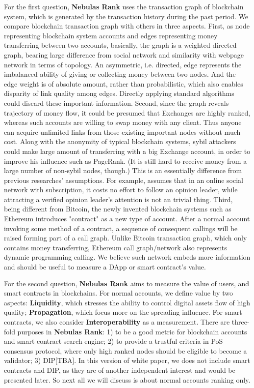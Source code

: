 For the first question, \textbf{Nebulas Rank} uses the transaction graph of blockchain system, which is generated by the transaction history during the past period. We compare blockchain transaction graph with others in three aspects. First, as node representing blockchain system accounts and edges representing money transferring between two accounts, basically, the graph is a weighted directed graph, bearing large difference from social network\cite{Ugander2011} and similarity with webpage network\cite{} in terms of topology. An asymmetric, i.e. directed, edge represents the imbalanced ability of giving or collecting money between two nodes. And the edge weight is of absolute amount, rather than probabilistic, which also enables disparity of link quality among edges. Directly applying standard algorithms could discard these important information. Second, since the graph reveals trajectory of money flow, it could be presumed that Exchanges are highly ranked, whereas such accounts are willing to swap money with any client. Thus anyone can acquire unlimited links from those existing important nodes without much cost. Along with the anonymity of typical blockchain systems, sybil attackers could make large amount of transferring with a big Exchange account, in order to improve his influence such as PageRank. (It is still hard to receive money from a large number of non-sybil nodes, though.) This is an essentially difference from previous researches' assumptions\cite{}. For example, \cite{} assumes that in an online social network with subscription\cite{}, it costs no effort to follow an opinion leader, while attracting a verified opinion leader's attention is not an trivial thing. Third, being different from Bitcoin\cite{}, the newly invented blockchain systems such as Ethereum\cite{} introduces "contract" as a new type of account. After a normal account invoking some method of a contract, a sequence of consequent callings will be raised forming part of a call graph. Unlike Bitcoin\cite{} transaction graph, which only contains money transferring, Ethereum call graph/network also represents dynamic programming calling. We believe such network embeds more information and should be useful to measure a DApp or smart contract's value.

For the second question, \textbf{Nebulas Rank} aims to measure the value of users, and smart contracts \cite{} in blockchains. For normal accounts, we define value by two aspects: \textbf{Liquidity}, which stresses the ability to control digital assets flow of high quality; \textbf{Propagation}, which focus more on the spreading influence. For smart contracts, we also consider \textbf{Interoperability} as a measurement. There are three-fold purposes in \textbf{Nebulas Rank}: 1) to be a good metric for blockchain accounts and smart contract search engine; 2) to provide a trustful criteria in PoS\cite{poelstra2015stake} consensus protocol, where only high ranked nodes should be eligible to become a validator; 3) DIP[TBA]. In this version of white paper, we does not include smart contracts and DIP, as they are of another independent interest and would be presented later. So next all we will discuss is about normal accounts ranking only.

